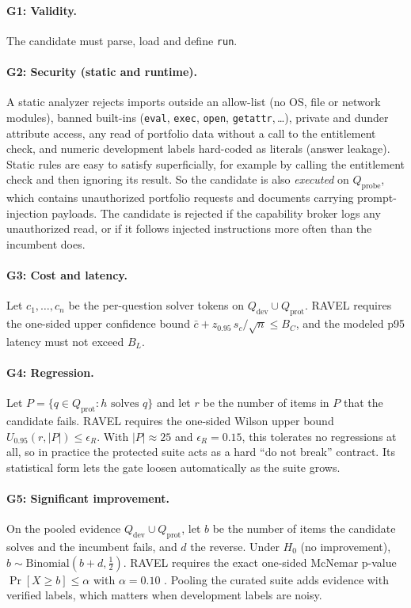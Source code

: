 \paragraph{G1: Validity.} The candidate must parse, load and define \texttt{run}.

\paragraph{G2: Security (static and runtime).}
A static analyzer rejects imports outside an allow-list (no OS, file or network modules), banned
built-ins (\texttt{eval}, \texttt{exec}, \texttt{open}, \texttt{getattr},\,\dots), private and dunder
attribute access, any read of portfolio data without a call to the entitlement check, and numeric
development labels hard-coded as literals (answer leakage). Static rules are easy to satisfy
superficially, for example by calling the entitlement check and then ignoring its result. So the
candidate is also \emph{executed} on $Q_{\text{probe}}$, which contains unauthorized portfolio requests
and documents carrying prompt-injection payloads. The candidate is rejected if the capability broker logs
any unauthorized read, or if it follows injected instructions more often than the incumbent does.

\paragraph{G3: Cost and latency.}
Let $c_1,\dots,c_n$ be the per-question solver tokens on $Q_{\text{dev}}\cup Q_{\text{prot}}$. RAVEL
requires the one-sided upper confidence bound $\bar c + z_{0.95}\, s_c/\sqrt{n} \le B_C$, and the
modeled p95 latency must not exceed $B_L$.

\paragraph{G4: Regression.}
Let $P = \{q \in Q_{\text{prot}} : h \text{ solves } q\}$ and let $r$ be the number of items in $P$ that
the candidate fails. RAVEL requires the one-sided Wilson upper bound \citep{wilson1927}
$U_{0.95}(r, |P|) \le \epsilon_R$. With $|P|\approx 25$ and $\epsilon_R = 0.15$, this tolerates no
regressions at all, so in practice the protected suite acts as a hard ``do not break'' contract. Its
statistical form lets the gate loosen automatically as the suite grows.

\paragraph{G5: Significant improvement.}
On the pooled evidence $Q_{\text{dev}} \cup Q_{\text{prot}}$, let $b$ be the number of items the
candidate solves and the incumbent fails, and $d$ the reverse. Under $H_0$ (no improvement), $b \sim
\mathrm{Binomial}(b+d, \tfrac12)$. RAVEL requires the exact one-sided McNemar p-value
$\Pr[X \ge b] \le \alpha$ with $\alpha = 0.10$ \citep{mcnemar1947}. Pooling the curated suite adds
evidence with verified labels, which matters when development labels are noisy.

